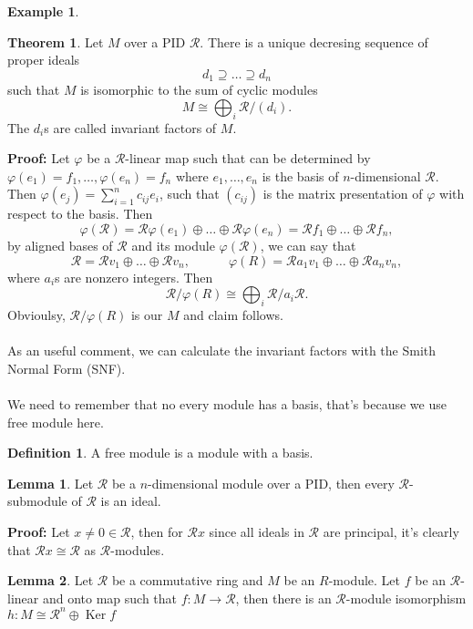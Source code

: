 \documentclass[11pt]{amsbook}%
\theoremstyle{plain}
\theoremstyle{definition}
\newtheorem{definition*}{Definition}
\newtheorem*{example*}{Example}
\newtheorem{lemma}{Lemma}
\newtheorem{theorem}{Theorem}
\numberwithin{equation}{section}
\newcommand{\CR}{\mathcal R}
\renewcommand{\proof}{ \textbf{Proof: }}
\DeclareMathOperator{\Ker}{Ker}
\begin{document}
\begin{example*}
\begin{theorem}
  \label{theo:1}
  Let $M$ over a PID $\CR$. There is a unique decresing sequence of proper ideals
  $$
  d_{1} \supseteq \dots \supseteq d_{n}
  $$
  such that $M$ is isomorphic to the sum of cyclic modules
  $$
  M \cong \bigoplus_{i} \CR/(d_{i}).
  $$
  The $d_{i}$s are called invariant factors of $M$.
\end{theorem} \vspace{1.8em}
\proof Let $\varphi$ be a $\CR$-linear map such that can be determined by $\varphi(e_{1}) = f_{1}, \dots, \varphi(e_{n}) = f_{n}$
where $e_{1}, \dots, e_{n}$ is the basis of $n$-dimensional $\CR$. Then $\varphi(e_{j}) = \sum_{i=1}^{n} c_{ij}e_{i}$, such that $(c_{ij})$ is the
matrix presentation of $\varphi$ with respect to the basis. Then
$$
\varphi(\CR) = \CR\varphi(e_{1}) \oplus \dots \oplus \CR\varphi(e_{n}) = \CR f_{1} \oplus \dots \oplus \CR f_{n},
$$
by aligned bases of $\CR$ and its module $\varphi(\CR)$, we can say that
$$
\CR = \CR v_{1} \oplus \dots \oplus \CR v_{n}, \hspace{3em} \varphi(R) = \CR a_{1}v_{1} \oplus \dots \oplus \CR a_{n}v_{n},
$$
where $a_{i}$s are nonzero integers. Then
$$
\CR/\varphi(R) \cong \bigoplus_{i} \CR/a_{i}\CR.
$$
Obvioulsy, $\CR/\varphi(R)$ is our $M$ and claim follows. \qedsymbol \\ \\
As an useful comment, we can calculate the invariant factors with the Smith Normal
Form (SNF). \\ \\
We need to remember that no every module has a basis, that's because
we use free module here.
\begin{definition*}
  \label{def-free-module}
  A free module is a module with a basis.
\end{definition*}
\begin{lemma}
  \label{lem:1}
  Let $\CR$ be a $n$-dimensional module over a PID, then every
  $\CR$-submodule of $\CR$ is an ideal.
\end{lemma} \vspace{1.8em}
\proof Let $x \neq 0 \in \CR$, then for $\CR x$ since all ideals in
$\CR$ are principal, it's clearly that $\CR x \cong \CR$ as $\CR$-modules.
\qedsymbol
\begin{lemma}
  \label{lem:2}
  Let $\CR$ be a commutative ring and $M$ be an $R$-module. Let $f$ be
  an $\CR$-linear and onto map such that $f: M \longrightarrow \CR$, then
  there is an $\CR$-module isomorphism $h: M \cong \CR^{n} \oplus \Ker f$

\end{lemma}
\end{example*}
\end{document}
